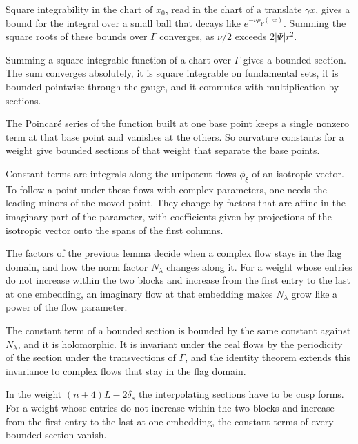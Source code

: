 Square integrability in the chart of $x_0$, read in the chart of a translate $\gamma x$, gives a bound for the
integral over a small ball that decays like $e^{-\nu\rho_Y(\gamma x)}$. Summing the square roots of these bounds over
$\Gamma$ converges, as $\nu/2$ exceeds $2|\Psi|r^2$.

Summing a square integrable function of a chart over $\Gamma$ gives a bounded section. The sum converges
absolutely, it is square integrable on fundamental sets, it is bounded pointwise through the gauge, and it
commutes with multiplication by sections.

The Poincaré series of the function built at one base point keeps a single nonzero term at that base point and
vanishes at the others. So curvature constants for a weight give bounded sections of that weight that separate
the base points.

Constant terms are integrals along the unipotent flows $\phi_\xi$ of an isotropic vector. To follow a point under
these flows with complex parameters, one needs the leading minors of the moved point. They change by factors that
are affine in the imaginary part of the parameter, with coefficients given by projections of the isotropic vector
onto the spans of the first columns.

The factors of the previous lemma decide when a complex flow stays in the flag domain, and how the norm factor
$N_\lambda$ changes along it. For a weight whose entries do not increase within the two blocks and increase from the
first entry to the last at one embedding, an imaginary flow at that embedding makes $N_\lambda$ grow like a power
of the flow parameter.

The constant term of a bounded section is bounded by the same constant against $N_\lambda$, and it is holomorphic.
It is invariant under the real flows by the periodicity of the section under the transvections of $\Gamma$, and the
identity theorem extends this invariance to complex flows that stay in the flag domain.

In the weight $(n+4)L-2\delta_s$ the interpolating sections have to be cusp forms. For a weight whose entries do
not increase within the two blocks and increase from the first entry to the last at one embedding, the constant
terms of every bounded section vanish.

